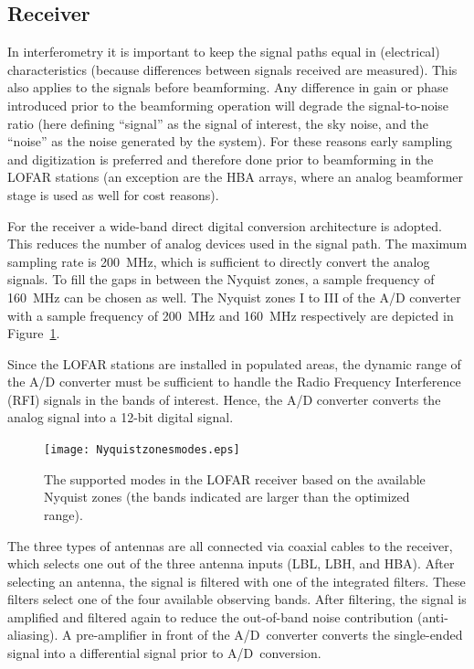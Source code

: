 \documentclass[journal]{IEEEtran}
\begin{document}
\subsection{Receiver}

In interferometry it is important to keep the signal paths equal in
(electrical) characteristics (because differences between signals received
are measured).
This also applies to the signals before beamforming.
Any difference in gain or phase introduced prior to the beamforming operation
will degrade the signal-to-noise ratio (here defining ``signal'' as the signal
of interest, the sky noise, and the ``noise'' as the noise generated by the
system).
For these reasons early sampling and digitization is preferred and therefore
done prior to beamforming in the LOFAR stations (an exception are the HBA
arrays, where an analog beamformer stage is used as well for cost reasons). 

For the receiver a wide-band direct digital conversion architecture is adopted.
This reduces the number of analog devices used in the signal path.
The maximum sampling rate is 200~MHz, which is sufficient to directly convert
the analog signals.
To fill the gaps in between the Nyquist zones, a sample frequency of 160~MHz
can be chosen as well.
The Nyquist zones I to III of the A/D converter with a sample frequency of
200~MHz and 160~MHz respectively are depicted in Figure~\ref{fig:nyquistzones}. 

Since the LOFAR stations are installed in populated areas, the dynamic range
of the A/D converter must be sufficient to handle the Radio Frequency
Interference (RFI) signals in the bands of interest.
Hence, the A/D converter converts the analog signal into a 12-bit digital
signal. 

\begin{figure}
\begin{center}
\texttt{[image: Nyquistzonesmodes.eps]}
\end{center}
\caption{The supported modes in the LOFAR receiver based on the available Nyquist zones (the bands indicated are larger than the optimized range).}
\label{fig:nyquistzones}
\end{figure}

The three types of antennas are all connected via coaxial cables to the
receiver, which selects one out of the three antenna inputs (LBL, LBH, and
HBA).
After selecting an antenna, the signal is filtered with one of the integrated
filters.
These filters select one of the four available observing bands.
After filtering, the signal is amplified and filtered again to reduce the
out-of-band noise contribution (anti-aliasing).
A pre-amplifier in front of the A/D~converter converts the single-ended signal
into a differential signal prior to A/D~conversion. 
\end{document}
